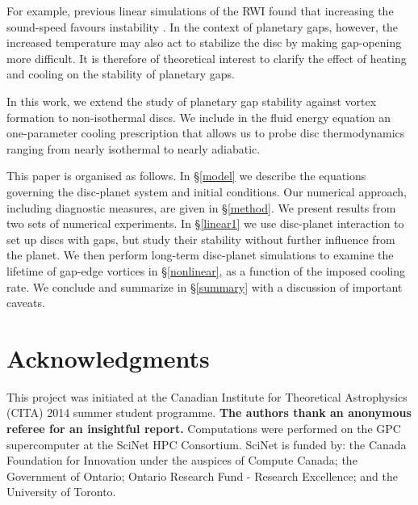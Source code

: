\documentclass[useAMS,usenatbib]{mn2e}
\begin{document}
For example, previous
linear simulations of the RWI found  
that increasing the sound-speed favours instability \citep{li00,lin13}.  
In the context of
planetary gaps, however, the increased temperature may also act to
stabilize the disc by making gap-opening more difficult. It is 
therefore of theoretical interest to clarify the effect of heating and
cooling on the stability of planetary gaps. 

In this work, we extend the study of planetary gap stability against
vortex formation to non-isothermal discs. We include in the fluid energy
equation an one-parameter cooling prescription that allows us to probe
disc thermodynamics ranging from nearly isothermal to nearly
adiabatic.      

This paper is organised as follows. In \S\ref{model} we describe the
equations governing the disc-planet system and initial conditions. Our
numerical approach, including diagnostic measures, are given in
\S\ref{method}. We present results from two sets of numerical
experiments. In \S\ref{linear1} we use disc-planet interaction to set
up discs with gaps, but study their stability without further
influence from the planet. %
We then perform long-term disc-planet simulations to examine the
lifetime of gap-edge vortices in \S\ref{nonlinear},  
as a function of the imposed cooling rate. We conclude and summarize
in \S\ref{summary} with a discussion of important caveats. 





%


\section*{Acknowledgments}
This project was initiated at the Canadian Institute for Theoretical
Astrophysics (CITA) 2014 summer student programme. {\bf The authors
  thank an anonymous referee for an insightful report.} 
Computations were performed on the GPC supercomputer at the
SciNet HPC Consortium. SciNet is funded by: the Canada Foundation for
Innovation under the auspices of Compute Canada; the Government of
Ontario; Ontario Research Fund - Research Excellence; and the
University of Toronto.   




\appendix
%
%
\end{document}

